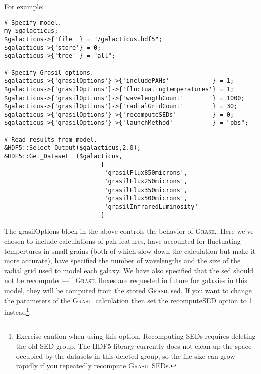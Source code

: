 For example:
\begin{verbatim}
# Specify model.                                                                                                                 
my $galacticus;
$galacticus->{'file' } = "/galacticus.hdf5";
$galacticus->{'store'} = 0;
$galacticus->{'tree' } = "all";

# Specify Grasil options.                                                                                                        
$galacticus->{'grasilOptions'}->{'includePAHs'            } = 1;
$galacticus->{'grasilOptions'}->{'fluctuatingTemperatures'} = 1;
$galacticus->{'grasilOptions'}->{'wavelengthCount'        } = 1000;
$galacticus->{'grasilOptions'}->{'radialGridCount'        } = 30;
$galacticus->{'grasilOptions'}->{'recomputeSEDs'          } = 0;
$galacticus->{'grasilOptions'}->{'launchMethod'           } = "pbs";

# Read results from model.                                                                                                       
&HDF5::Select_Output($galacticus,2.0);
&HDF5::Get_Dataset  ($galacticus,
                           [
                            'grasilFlux850microns',
                            'grasilFlux250microns',
                            'grasilFlux350microns',
                            'grasilFlux500microns',
                            'grasilInfraredLuminosity'
                           ]
\end{verbatim}
The {\normalfont \ttfamily grasilOptions} block in the above controls the behavior of {\normalfont \scshape Grasil}. Here we've chosen to include calculations of \gls{pah} features, have accounted for fluctuating tempertures in small grains (both of which slow down the calculation but make it more accurate), have specified the number of wavelengths and the size of the radial grid used to model each galaxy. We have also specified that the \gls{sed} should not be recomputed---if {\normalfont \scshape Grasil} fluxes are requested in future for galaxies in this model, they will be computed from the stored {\normalfont \scshape Grasil} \gls{sed}. If you want to change the parameters of the {\normalfont \scshape Grasil} calculation then set the {\normalfont \ttfamily recomputeSED} option to 1 instead\footnote{Exercise caution when using this option. Recomputing SEDs requires deleting the old SED group. The HDF5 library currently does not clean up the space occupied by the datasets in this deleted group, so the file size can grow rapidly if you repeatedly recompute {\normalfont \scshape Grasil} SEDs.}.

